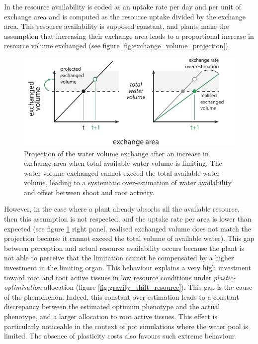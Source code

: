 In \model the resource availability is coded as an uptake rate per day and per unit of exchange area and is computed as the resource uptake divided by the exchange area. This resource availability is supposed constant, and plants make the assumption that increasing their exchange area leads to a proportional increase in resource volume exchanged (see figure \ref{fig:exchange_volume_projection}).

\begin{figure}\label{fig:exhaustion}
\includegraphics[width = \textwidth]{./2_PP/Figures/Concepts/exhaustion2.pdf}
\caption{Projection of the water volume exchange after an increase in exchange area when total available water volume is limiting. The water volume exchanged cannot exceed the total available water volume, leading to a systematic over-estimation of water availability and offset between shoot and root activity.}
\end{figure}

However, in the case where a plant already absorbs all the available resource, then this assumption is not respected, and the uptake rate per area is lower than expected (see figure \ref{fig:exhaustion} right panel, realised exchanged volume does not match the projection because it cannot exceed the total volume of available water). This gap between perception and actual resource availability occurs because the plant is not able to perceive that the limitation cannot be compensated by a higher investment in the limiting organ. This behaviour explains a very high investment toward root and root active tissues in low resource conditions under \textit{plastic-optimisation} allocation (figure \ref{fig:gravity_shift_resource}). This gap is the cause of the  phenomenon. Indeed, this constant over-estimation leads to a constant discrepancy between the estimated optimum phenotype and the actual phenotype, and a larger allocation to root active tissues. This effect is particularly noticeable in the context of pot simulations where the water pool is limited. The absence of plasticity costs also favours such extreme behaviour. 

